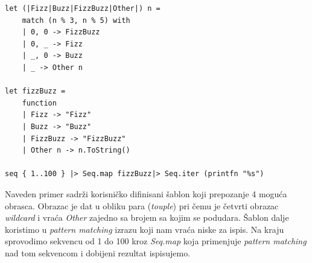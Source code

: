 \documentclass[a4paper]{article}
\begin{document}
\begin{lstlisting}[caption={Fizz Buzz\cite{fizzBuzz}},frame=single, label=primer]
let (|Fizz|Buzz|FizzBuzz|Other|) n =
    match (n % 3, n % 5) with
    | 0, 0 -> FizzBuzz
    | 0, _ -> Fizz
    | _, 0 -> Buzz
    | _ -> Other n

let fizzBuzz =
    function
    | Fizz -> "Fizz"
    | Buzz -> "Buzz"
    | FizzBuzz -> "FizzBuzz"
    | Other n -> n.ToString()

seq { 1..100 } |> Seq.map fizzBuzz|> Seq.iter (printfn "%s")
\end{lstlisting}

Naveden primer sadrži korisničko difinisani šablon koji prepozanje 4 moguća obrasca. Obrazac je dat u obliku para (\textit{touple}) pri čemu je četvrti obrazac \textit{wildcard} i vraća \textit{Other} zajedno sa brojem sa kojim se podudara. Šablon dalje koristimo u \textit{pattern matching} izrazu koji nam vraća niske za ispis. Na kraju sprovodimo sekvencu od 1 do 100 kroz \textit{Seq.map} koja primenjuje \textit{pattern matching} nad tom sekvencom i dobijeni rezultat ispisujemo.
\end{document}
